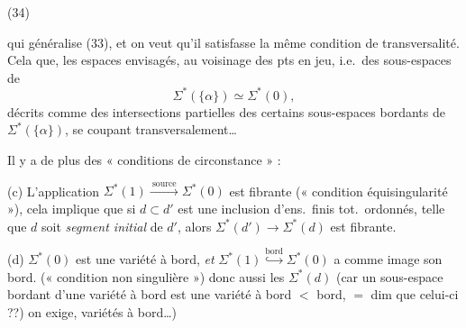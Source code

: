 \documentclass[11pt,a4paper]{article}
\begin{document}
(34)



qui généralise (33), et on  veut qu'il satisfasse la même condition de transversalité. Cela  que, les espaces envisagés, au voisinage des pts en jeu, i.e.\ des sous-espaces de
\[
\Sigma^{*}(\lbrace\alpha\rbrace)\simeq\Sigma^{*}(0),
\]
décrits  comme des intersections partielles des certains sous-espaces bordants de $\Sigma^{*}(\lbrace\alpha\rbrace)$, se coupant transversalement\ldots


Il y a de plus des « conditions de circonstance » :

(c) L'application $\Sigma^{*}(1)\xrightarrow{\ \mathrm{source}\ }\Sigma^{*}(0)$ est  fibrante (« condition équisingularité »), cela implique que si $d\subset d'$ est une inclusion d'ens.\ finis tot.\ ordonnés, telle que $d$ soit \emph{segment initial} de $d'$, alors $\Sigma^{*}(d')\to\Sigma^{*}(d)$ est fibrante.

(d)  $\Sigma^{*}(0)$ est \struck{\ill{}} une variété à bord, \emph{et} $\Sigma^{*}(1)\overset{\mathrm{bord}}{\hookrightarrow}\Sigma^{*}(0)$ a comme image son bord. (« condition non singulière ») donc aussi les $\Sigma^{*}(d)$ (car un sous-espace bordant d'une variété à bord est une variété à bord \struck{\ill{}}  $<$ bord, $=$ dim que celui-ci ??)  on exige,   variétés à bord\ldots)

\end{document}
